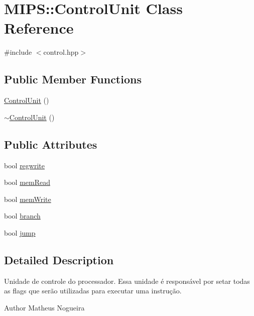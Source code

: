 \hypertarget{classMIPS_1_1ControlUnit}{}\section{M\+I\+PS\+:\+:Control\+Unit Class Reference}
\label{classMIPS_1_1ControlUnit}


{\ttfamily \#include $<$control.\+hpp$>$}

\subsection*{Public Member Functions}
\begin{DoxyCompactItemize}
\item 
\hyperlink{classMIPS_1_1ControlUnit_a4e7f136cf15bc78b878082ba5fe5b629}{Control\+Unit} ()
\item 
\hyperlink{classMIPS_1_1ControlUnit_a6e1a1d7cd85594c9a575a432770c3aa2}{$\sim$\+Control\+Unit} ()
\end{DoxyCompactItemize}
\subsection*{Public Attributes}
\begin{DoxyCompactItemize}
\item 
bool \hyperlink{classMIPS_1_1ControlUnit_a18884b753a77aa99c9ff404e16c6ac7a}{regwrite}
\item 
bool \hyperlink{classMIPS_1_1ControlUnit_abe9e61b37cb75b89cdde98446d89e89d}{mem\+Read}
\item 
bool \hyperlink{classMIPS_1_1ControlUnit_aba0c87c1f08276807cd241a9484980bc}{mem\+Write}
\item 
bool \hyperlink{classMIPS_1_1ControlUnit_aa19c9a24c47bdde835e273e81a485e28}{branch}
\item 
bool \hyperlink{classMIPS_1_1ControlUnit_a13c01a649cd685fc1a52e3c3c45e96e7}{jump}
\end{DoxyCompactItemize}


\subsection{Detailed Description}
Unidade de controle do processador. Essa unidade é responsável por setar todas as flags que serão utilizadas para executar uma instrução.

\begin{DoxyAuthor}{Author}
Matheus Nogueira 
\end{DoxyAuthor}


